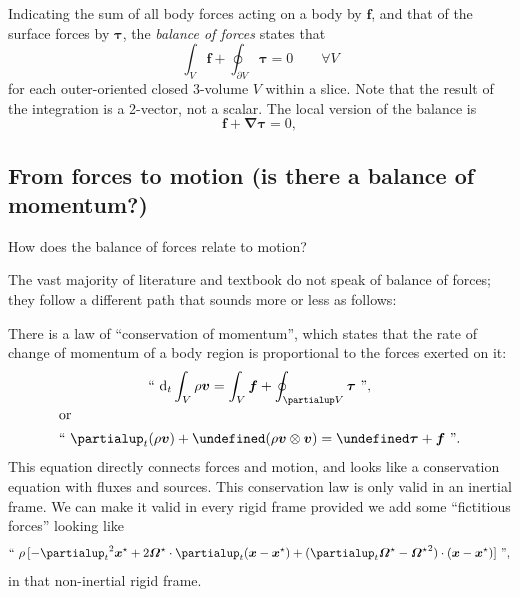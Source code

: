 \documentclass[\ifafour a4paper,12pt,\else a5paper,10pt,\fi%
onecolumn,oneside,article,%
british%
]{memoir}
\theoremstyle{remark}
\theoremstyle{innote}
\newcommand*{\de}{\partialup}%
\newcommand*{\di}{\mathrm{d}}%
\renewcommand*{\|}[1][]{\nonscript\,#1\vert\nonscript\;\mathopen{}}
\let\div\undefined
\DeclareMathOperator{\div}{div}
\newcommand*{\yTT}{\tau}
\newcommand*{\yT}{\bm{\yTT}}
\newcommand*{\ybb}{f}
\newcommand*{\yb}{\bm{\ybb}}
\newcommand*{\yxxt}{x}
\newcommand*{\yxt}{\bm{\yxxt}}
\newcommand*{\yxto}{\bm{\yxxt}^{\mathord{\star}}}
\newcommand*{\yvvt}{v}
\newcommand*{\yvt}{\bm{\yvvt}}
\newcommand*{\yomm}{\varOmega}
\newcommand*{\yom}{\bm{\yomm}^{\mathord{\star}}}
\newcommand*{\yDi}{\pmb{\bm{\nabla}}}
\newcommand*{\yvo}{V}
\begin{document}
Indicating the sum of all body forces acting on a body by $\yb$, and that
of the surface forces by $\yT$, the \emph{balance of forces} states that
\begin{equation}
  \label{eq:force_balance_integral}
  \int_{\yvo} \yb + \oint_{\de\yvo} \yT = 0 \qquad\forall \yvo
\end{equation}
for each outer-oriented closed 3-volume $\yvo$ within a slice. Note that the
result of the integration is a 2-vector, not a scalar. The local version of
the balance is
\begin{equation}
  \label{eq:force_balance_ecd_local}
  \yb + \yDi \yT = 0, 
\end{equation}

\subsection{From forces to motion (is there a balance of
  momentum?)}
\label{sec:really_balance_momentum}

How does the balance of forces relate to motion?

The vast majority of literature and textbook do not speak of balance of
forces; they follow a different path that sounds more or less as follows:

There is a law of \enquote{conservation of momentum}, which states that the
rate of change of momentum of a body region is proportional to the forces
exerted on it:
\begin{subequations}\label{eq:conservation_momentum_traditional}
  \begin{gather}
    \label{eq:conservation_momentum_traditional_integral}
    \text{\textquotedblleft}\ 
    \di_t\int_{\yvo}\rho\yvt = \int_{\yvo} \yb + \oint_{\de\yvo} \yT
    \ \text{\textquotedblright},
    \\\shortintertext{or}
    \label{eq:conservation_momentum_traditional_differential}
    \text{\textquotedblleft}\ 
    \de_t(\rho\yvt) + \div(\rho\yvt\otimes\yvt) = \div\yT +\yb
    \ \text{\textquotedblright}.
  \end{gather}
\end{subequations}
This equation directly connects forces and motion, and looks like a
conservation equation with fluxes and sources. This conservation law is
only valid in an inertial frame. We can make it valid in every rigid frame
provided we add some \enquote{fictitious forces} looking like
\begin{equation}
  \label{eq:fictitious_forces}
    \text{\textquotedblleft}\ 
  \rho\, [-{\de_t}^2\yxto%
  + 2\yom\cdot\de_t(\yxt-\yxto) + (\de_t\yom-{\yom}^2)\cdot(\yxt-\yxto)]
    \ \text{\textquotedblright},
\end{equation}
in that non-inertial rigid frame.
\end{document}
